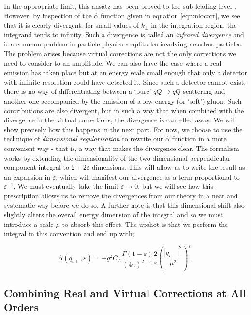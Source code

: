 In the appropriate limit, this ansatz has been proved to the sub-leading level \cite{Bogdan2006,Fadin2005,Fadin2004,Fadin2006}. However, by inspection of the $\hat{\alpha}$ function given in equation \ref{eqn:nlocorr}, we see that it is clearly divergent; for small values of $k_\perp$ in the integration region, the integrand tends to infinity. Such a divergence is called an \emph{infrared divergence} and is a common problem in particle physics amplitudes involving massless particles. The problem arises because virtual corrections are not the only corrections we need to consider to an amplitude. We can also have the case where a real emission has taken place but at an energy scale small enough that only a detector with infinite resolution could have detected it. Since such a detector cannot exist, there is no way of differentiating between a `pure' $qQ \to qQ$ scattering and another one accompanied by the emission of a low energy (or `soft') gluon. Such contributions are also divergent, but in such a way that when combined with the divergence in the virtual corrections, the divergence is cancelled away. We will show precisely how this happens in the next part. For now, we choose to use the technique of \emph{dimensional regularisation} to rewrite our $\hat{\alpha}$ function in a more convenient way - that is, a way that makes the divergence clear. The formalism works by extending the dimensionality of the two-dimensional perpendicular component integral to $2 + 2 \varepsilon$ dimensions. This will allow us to write the result as an expansion in $\varepsilon$, which will manifest our divergence as a term proportional to $\varepsilon^{-1}$. We must eventually take the limit $\varepsilon \to 0$, but we will see how this prescription allows us to remove the divergences from our theory in a neat and systematic way before we do so. A further note is that this dimensional shift also slightly alters the overall energy dimension of the integral and so we must introduce a scale $\mu$ to absorb this effect. The upshot is that we perform the integral in this convention and end up with; %

\begin{equation}
\hat{\alpha}(q_{i \perp}, \varepsilon) = - g^2 C_A \frac{\Gamma(1 - \varepsilon)}{(4 \pi)^{2 + \varepsilon}} \frac{2}{\varepsilon} \left(\frac{|q_{i \perp}|^2}{\mu^2} \right)^\varepsilon.
\end{equation}

\subsection{Combining Real and Virtual Corrections at All Orders}

